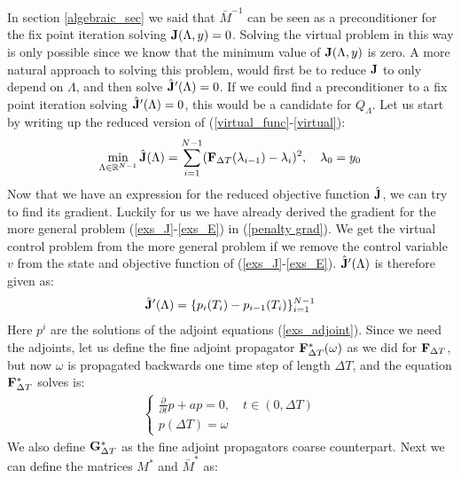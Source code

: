 \documentclass[11pt,a4paper]{article}
\begin{document}
In section \ref{algebraic_sec} we said that $\bar M^{-1}$ can be seen as a preconditioner for the fix point iteration solving $\bold{J}(\Lambda,y)=0$. Solving the virtual problem in this way is only possible since we know that the minimum value of $\bold{J}(\Lambda,y)$ is zero. A more natural approach to solving this problem, would first be to reduce $\bold J$ to only depend on $\Lambda$, and then solve $\hat {\bold J}'(\Lambda)=0$. If we could find a preconditioner to a fix point iteration solving $\hat{ \bold J} '(\Lambda)=0$, this would be a candidate for $Q_{\Lambda}$. Let us start by writing up the reduced version of (\ref{virtual_func}-\ref{virtual}):
\begin{align}
\min_{\Lambda\in\mathbb{R}^{N-1}}\hat {\bold J}(\Lambda) = \sum_{i=1}^{N-1} (\bold F_{\Delta T}(\lambda_{i-1})-\lambda_{i})^2,\quad \lambda_0=y_0 \label{reduced_viritual}
\end{align} 
Now that we have an expression for the reduced objective function $\hat {\bold J}$, we can try to find its gradient. Luckily for us we have already derived the gradient for the more general problem (\ref{exs_J}-\ref{exs_E}) in (\ref{penalty grad}). We get the virtual control problem from the more general problem if we remove the control variable $v$ from the state and objective function of (\ref{exs_J}-\ref{exs_E}). $\hat {\bold J}'(\Lambda)$ is therefore given as:
\begin{align*}
\hat{\bold J}'(\Lambda) = \{p_i(T_i)-p_{i-1}(T_i)\}_{i=1}^{N-1}
\end{align*}
Here $p^i$ are the solutions of the adjoint equations (\ref{exs_adjoint}). Since we need the adjoints, let us define the fine adjoint propagator $\bold{F}_{\Delta T}^*(\omega)$ as we did for $\bold{F}_{\Delta T}$, but now $\omega$ is propagated backwards one time step of length $\Delta T$, and the equation $\bold{F}_{\Delta T}^*$ solves is:   
\begin{align}
\left\{
     \begin{array}{lr}
	\frac{\partial }{\partial t}p +ap=0,\quad t\in (0,\Delta T)  \\
	p(\Delta T) = \omega
	\end{array}
   \right. \label{virtual_adjoint_exs}
\end{align}
We also define $\bold G_{\Delta T}^*$ as the fine adjoint propagators coarse counterpart. Next we can define the matrices $M^*$ and $\bar M^*$ as:
\end{document}
